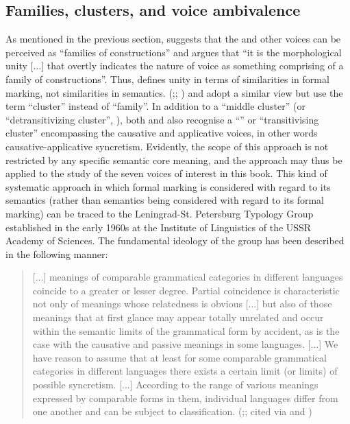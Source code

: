 \subsection{Families, clusters, and voice ambivalence} \label{families-clusters}
As mentioned in the previous section, \citet[1147f.]{shibatani:2004} suggests that the  and other voices can be perceived as “families of constructions” and argues that “it is the morphological unity [...] that overtly indicates the nature of voice as something comprising of a family of constructions”. Thus, \citeauthor{shibatani:2004} defines unity in terms of similarities in formal marking, not similarities in semantics. \citeauthor{kulikov:2010} (\citeyear[394f.]{kulikov:2010};; \citeyear[265ff.]{kulikov:2013}) and \citet[175ff.]{zuniga:kittila:2019} adopt a similar view but use the term “cluster” instead of “family”. In addition to a “middle cluster” (or “detransitivizing cluster”, \citealt[237]{zuniga:kittila:2019}), both \citet[395]{kulikov:2010} and \citet[234ff.]{zuniga:kittila:2019} also recognise a “” or “transitivising cluster” encompassing the causative and applicative voices, in other words causative-applicative syncretism. Evidently, the scope of this approach is not restricted by any specific semantic core meaning, and the approach may thus be applied to the study of the seven voices of interest in this book. This kind of systematic approach in which formal marking is considered with regard to its semantics (rather than semantics being considered with regard to its formal marking) can be traced to the Leningrad-St. Petersburg Typology Group established in the early 1960s at the Institute of Linguistics of the USSR Academy of Sciences. The fundamental ideology of the group has been described in the following manner:

\begin{quote}
	[...] meanings of comparable grammatical categories in different languages coincide to a greater or lesser degree. Partial coincidence is characteristic not only of meanings whose relatedness is obvious [...] but also of those meanings that at first glance may appear totally unrelated and occur within the semantic limits of the grammatical form by accident, as is the case with the causative and passive meanings in some languages. [...] We have reason to assume that at least for some comparable grammatical categories in different languages there exists a certain limit (or limits) of possible syncretism. [...] According to the range of various meanings expressed by comparable forms in them, individual languages differ from one another and can be subject to classification. (\citealt[301f.]{nedjalkov:1964};; cited via \citealt[xii]{nedjalkov:1988} and \citealt[vii]{comrie:polinsky:1993})
\end{quote} 

